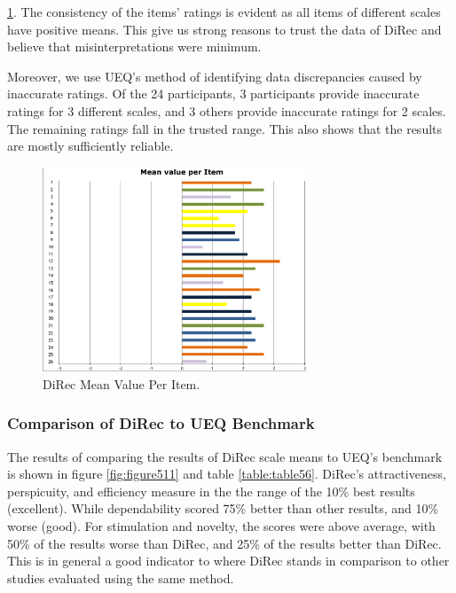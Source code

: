 \ref{fig:figure510}. The consistency of the items' ratings is evident
as all items of different scales have positive means. This give us strong
reasons to trust the data of DiRec and believe that misinterpretations were
minimum.\par
Moreover, we use UEQ's method of identifying data discrepancies caused by
inaccurate ratings. Of the 24 participants, 3 participants provide inaccurate
ratings for 3 different scales, and 3 others provide inaccurate ratings for 2
scales. The remaining ratings fall in the trusted range. This also shows that
the results are mostly sufficiently reliable.
\begin{figure}[!htbp]
\centering
\includegraphics[width=0.7\textwidth]{figures/direc-results3}
\caption{DiRec Mean Value Per Item.}
\label{fig:figure510}
\end{figure}
\subsubsection{Comparison of DiRec to UEQ Benchmark}
The results of comparing the results of DiRec scale means to UEQ's benchmark is
shown in figure \ref{fig:figure511} and table \ref{table:table56}. DiRec's
attractiveness, perspicuity, and efficiency measure in the the range of the 10\%
best results (excellent). While dependability scored 75\% better than other
results, and 10\% worse (good). For stimulation and novelty, the scores were
above average, with 50\% of the results worse than DiRec, and 25\% of the
results better than DiRec. This is in general a good indicator to where DiRec stands in
comparison to other studies evaluated using the same method.

